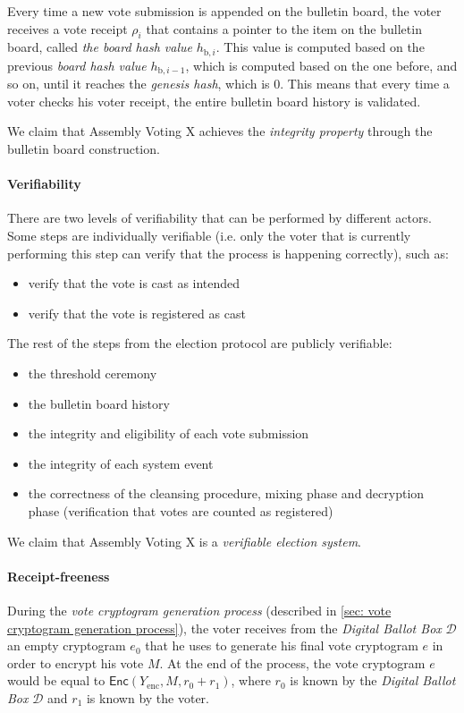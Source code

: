 Every time a new vote submission is appended on the bulletin board, the voter receives a vote receipt $\rho_i$ that contains a pointer to the item on the bulletin board, called \textit{the board hash value} $h_{\mathrm{b}, i}$. This value is computed based on the previous \textit{board hash value} $h_{\mathrm{b}, i-1}$, which is computed based on the one before, and so on, until it reaches the \textit{genesis hash}, which is 0. This means that every time a voter checks his voter receipt, the entire bulletin board history is validated.

We claim that Assembly Voting X achieves the \textit{integrity property} through the bulletin board construction.

\paragraph{Verifiability}
There are two levels of verifiability that can be performed by different actors. Some steps are individually verifiable (i.e. only the voter that is currently performing this step can verify that the process is happening correctly), such as:
\begin{itemize}
    \item verify that the vote is cast as intended
    \item verify that the vote is registered as cast
\end{itemize}
The rest of the steps from the election protocol are publicly verifiable:
\begin{itemize}
    \item the threshold ceremony
    \item the bulletin board history
    \item the integrity and eligibility of each vote submission
    \item the integrity of each system event
    \item the correctness of the cleansing procedure, mixing phase and decryption phase (verification that votes are counted as registered)
\end{itemize}

We claim that Assembly Voting X is a \textit{verifiable election system}.

\paragraph{Receipt-freeness}
During the \textit{vote cryptogram generation process} (described in \cref{sec: vote cryptogram generation process}), the voter receives from the \textit{Digital Ballot Box} $\mathcal{D}$ an empty cryptogram $e_0$ that he uses to generate his final vote cryptogram $e$ in order to encrypt his vote $M$. At the end of the process, the vote cryptogram $e$ would be equal to \( \mathsf{Enc} (Y_\mathrm{enc}, M, r_0 + r_1) \), where $r_0$ is known by the \textit{Digital Ballot Box} $\mathcal{D}$ and $r_1$ is known by the voter.

